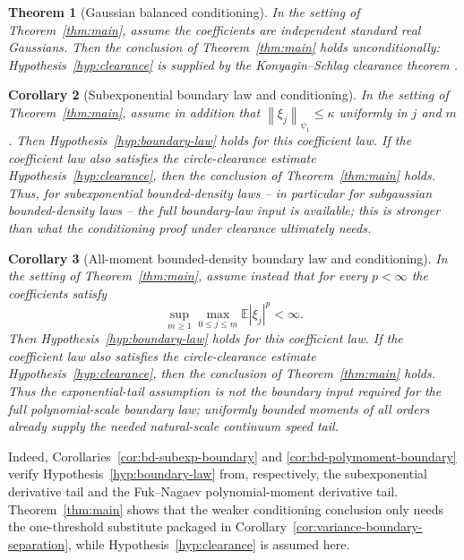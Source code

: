 \documentclass[11pt]{amsart}
\numberwithin{equation}{section}
\newtheorem{theorem}{Theorem}[section]
\newtheorem{corollary}[theorem]{Corollary}
\theoremstyle{definition}
\theoremstyle{remark}
\newcommand{\Exp}{\mathbb E}
\newcommand{\norm}[1]{\left\lVert #1\right\rVert}
\newcommand{\abs}[1]{\left\lvert #1\right\rvert}
\begin{document}
\begin{theorem}[Gaussian balanced conditioning]\label{thm:gaussian-main}
In the setting of Theorem~\ref{thm:main}, assume the coefficients are
independent standard real Gaussians. Then the conclusion of
Theorem~\ref{thm:main} holds unconditionally: Hypothesis~\ref{hyp:clearance} is
supplied by the Konyagin--Schlag clearance theorem \cite{KMS}.
\end{theorem}

\begin{corollary}[Subexponential boundary law and conditioning]\label{cor:subexp-main}
In the setting of Theorem~\ref{thm:main}, assume in addition that
\(\norm{\xi_j}_{\psi_1}\le\kappa\) uniformly in \(j\) and \(m\). Then
Hypothesis~\ref{hyp:boundary-law} holds for this coefficient law. If the
coefficient law also satisfies the circle-clearance estimate
Hypothesis~\ref{hyp:clearance}, then the conclusion of Theorem~\ref{thm:main}
holds. Thus, for subexponential bounded-density laws -- in particular for
subgaussian bounded-density laws -- the full boundary-law input is available;
this is stronger than what the conditioning proof under clearance ultimately
needs.
\end{corollary}

\begin{corollary}[All-moment bounded-density boundary law and conditioning]\label{cor:allmoment-main}
In the setting of Theorem~\ref{thm:main}, assume instead that for every
\(p<\infty\) the coefficients satisfy
\[
  \sup_{m\ge1}\max_{0\le j\le m}\Exp\abs{\xi_j}^{p}<\infty .
\]
Then Hypothesis~\ref{hyp:boundary-law} holds for this coefficient law. If the
coefficient law also satisfies the circle-clearance estimate
Hypothesis~\ref{hyp:clearance}, then the conclusion of Theorem~\ref{thm:main}
holds. Thus the exponential-tail assumption is not the boundary input required
for the full polynomial-scale boundary law; uniformly bounded moments of all
orders already supply the needed natural-scale continuum speed tail.
\end{corollary}

Indeed, Corollaries~\ref{cor:bd-subexp-boundary} and
\ref{cor:bd-polymoment-boundary} verify Hypothesis~\ref{hyp:boundary-law} from,
respectively, the subexponential derivative tail and the Fuk--Nagaev
polynomial-moment derivative tail. Theorem~\ref{thm:main} shows that the weaker
conditioning conclusion only needs the one-threshold substitute packaged in
Corollary~\ref{cor:variance-boundary-separation}, while
Hypothesis~\ref{hyp:clearance} is assumed here.
\end{document}
